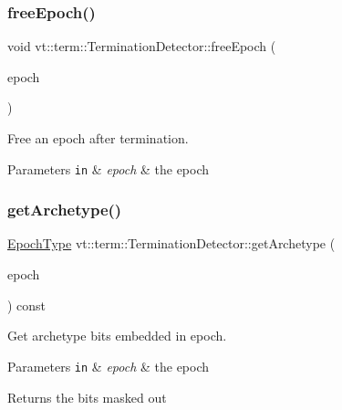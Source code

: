 \subsubsection{\texorpdfstring{free\+Epoch()}{freeEpoch()}}
{\footnotesize\ttfamily void vt\+::term\+::\+Termination\+Detector\+::free\+Epoch (\begin{DoxyParamCaption}\item[{\hyperlink{namespacevt_a985a5adf291c34a3ca263b3378388236}{Epoch\+Type} const \&}]{epoch }\end{DoxyParamCaption})}



Free an epoch after termination. 


\begin{DoxyParams}[1]{Parameters}
\mbox{\tt in}  & {\em epoch} & the epoch \\
\hline
\end{DoxyParams}
\mbox{\label{structvt_1_1term_1_1_termination_detector_ad812a021139b95077ff0168611401334}} 
\subsubsection{\texorpdfstring{get\+Archetype()}{getArchetype()}}
{\footnotesize\ttfamily \hyperlink{namespacevt_a985a5adf291c34a3ca263b3378388236}{Epoch\+Type} vt\+::term\+::\+Termination\+Detector\+::get\+Archetype (\begin{DoxyParamCaption}\item[{\hyperlink{namespacevt_a985a5adf291c34a3ca263b3378388236}{Epoch\+Type} const \&}]{epoch }\end{DoxyParamCaption}) const\hspace{0.3cm}{\ttfamily [private]}}



Get archetype bits embedded in epoch. 


\begin{DoxyParams}[1]{Parameters}
\mbox{\tt in}  & {\em epoch} & the epoch\\
\hline
\end{DoxyParams}
\begin{DoxyReturn}{Returns}
the bits masked out 
\end{DoxyReturn}
\mbox{\label{structvt_1_1term_1_1_termination_detector_a546a48949da827a98dea2cfaffeddb91}} 

